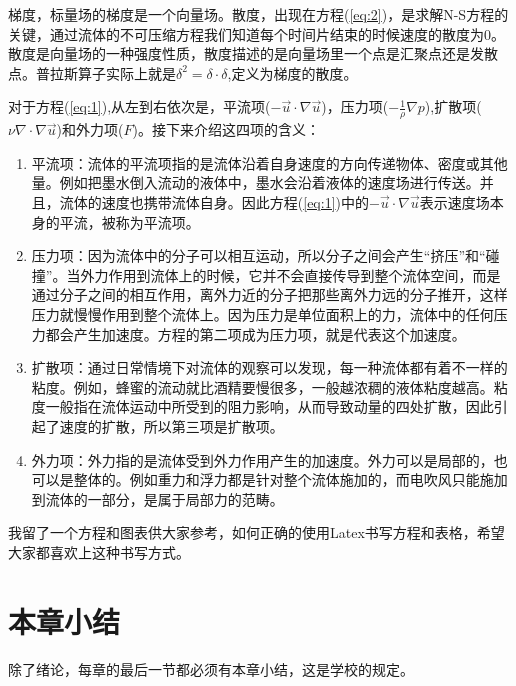 梯度，标量场的梯度是一个向量场。散度，出现在方程(\ref{eq:2})，是求解N-S方程的关键，通过流体的不可压缩方程我们知道每个时间片结束的时候速度的散度为0。散度是向量场的一种强度性质，散度描述的是向量场里一个点是汇聚点还是发散点。普拉斯算子实际上就是$\delta^2 = \delta \cdot \delta$,定义为梯度的散度。

对于方程(\ref{eq:1}),从左到右依次是，平流项($- \vec u \cdot \nabla \vec u$)，压力项($- \frac{1}{\rho}\nabla p$),扩散项($\nu \nabla \cdot \nabla \vec u$)和外力项($F$)。接下来介绍这四项的含义\cite{04}：
\begin{enumerate}
\item 平流项：流体的平流项指的是流体沿着自身速度的方向传递物体、密度或其他量。例如把墨水倒入流动的液体中，墨水会沿着液体的速度场进行传送。并且，流体的速度也携带流体自身。因此方程(\ref{eq:1})中的$- \vec u \cdot \nabla \vec u$表示速度场本身的平流，被称为平流项。
\item 压力项：因为流体中的分子可以相互运动，所以分子之间会产生``挤压''和``碰撞''。当外力作用到流体上的时候，它并不会直接传导到整个流体空间，而是通过分子之间的相互作用，离外力近的分子把那些离外力远的分子推开，这样压力就慢慢作用到整个流体上。因为压力是单位面积上的力，流体中的任何压力都会产生加速度。方程的第二项成为压力项，就是代表这个加速度。
\item 扩散项：通过日常情境下对流体的观察可以发现，每一种流体都有着不一样的粘度。例如，蜂蜜的流动就比酒精要慢很多，一般越浓稠的液体粘度越高。粘度一般指在流体运动中所受到的阻力影响，从而导致动量的四处扩散，因此引起了速度的扩散，所以第三项是扩散项。
\item 外力项：外力指的是流体受到外力作用产生的加速度。外力可以是局部的，也可以是整体的。例如重力和浮力都是针对整个流体施加的，而电吹风只能施加到流体的一部分，是属于局部力的范畴。
\end{enumerate}

我留了一个方程和图表供大家参考，如何正确的使用Latex书写方程和表格，希望大家都喜欢上这种书写方式。


\section{本章小结}

除了绪论，每章的最后一节都必须有本章小结，这是学校的规定。
